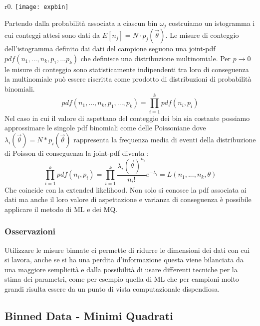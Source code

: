 \documentclass[11pt,a4paper]{book}
\begin{document}
\begin{wrapfigure}{r}{0.\textwidth}
\centering
\texttt{[image: expbin]}	
\end{wrapfigure}
Partendo dalla probabilit\`{a} associata a ciascun bin $\omega_j$ costruiamo un istogramma i cui conteggi attesi sono dati da $ E[n_{j}] = N \cdot p_j(\vec{\theta})$. Le misure di conteggio dell'istogramma definito dai dati del campione seguono una joint-pdf $pdf(n_1,...,n_k,p_1,...p_k)$ che definisce una distribuzione multinomiale. Per $p \rightarrow 0 $ le misure di conteggio sono statisticamente indipendenti tra loro di conseguenza la multinomiale pu\`{o} essere riscritta come prodotto di distribuzioni di probabilit\`{a} binomiali.
\begin{equation*}
	pdf(n_1,...,n_k,p_1,...,p_k) = \prod_{i=1}^kpdf(n_i,p_i)
\end{equation*}
Nel caso in cui il valore di aspettano del conteggio dei bin sia costante possiamo approssimare le singole pdf binomiali come delle Poissoniane dove $\lambda_{i}(\vec{\theta}) = N * p_i(\vec{\theta})$ rappresenta la frequenza media di eventi della distribuzione di Poisson di conseguenza la joint-pdf diventa :
\begin{equation*}
	\prod_{i=1}^kpdf(n_i,p_i) = \prod_{i=1}^k \dfrac{\lambda_i(\vec{\theta})^{n_{i}}}{n_{i}!}e^{-\lambda_{i}} = L(n_1,...,n_k,\theta)
\end{equation*}
Che coincide con la extended likelihood.\newline
Non solo si conosce la pdf associata ai dati ma anche il loro valore di aspettazione e varianza di conseguenza \`{e} possibile applicare il metodo di ML e dei MQ.
\subsubsection{Osservazioni}

Utilizzare le misure binnate ci permette di ridurre le dimensioni dei dati con cui si lavora, anche se si ha una perdita d'informazione questa viene bilanciata da una maggiore semplicit\`{a} e dalla possibilit\`{a} di usare differenti tecniche per la stima dei parametri, come per esempio quella di ML che per campioni molto grandi risulta essere da un punto di vista computazionale dispendiosa.

\subsection{Binned Data - Minimi Quadrati}
\end{document}
